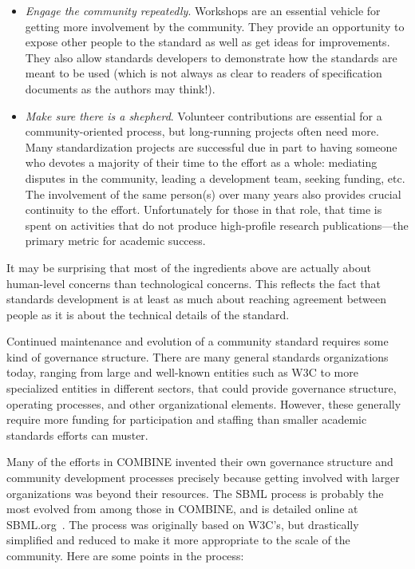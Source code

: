 \begin{itemize}
\item \emph{Engage the community repeatedly}.  Workshops are an essential vehicle for getting more involvement by the community.  They provide an opportunity to expose other people to the standard as well as get ideas for improvements.  They also allow standards developers to demonstrate how the standards are meant to be used (which is not always as clear to readers of specification documents as the authors may think!).

\item \emph{Make sure there is a shepherd}. Volunteer contributions are essential for a community-oriented process, but long-running projects often need more.  Many standardization projects are successful due in part to having someone who devotes a majority of their time to the effort as a whole: mediating disputes in the community, leading a development team, seeking funding, etc.  The involvement of the same person(s) over many years also provides crucial continuity to the effort.  Unfortunately for those in that role, that time is spent on activities that do not produce high-profile research publications---the primary metric for academic success.

\end{itemize}
\vspace*{-1em}

It may be surprising that most of the ingredients above are actually about human-level concerns than technological concerns.  This reflects the fact that standards development is at least as much about reaching agreement between people as it is about the technical details of the standard.


\clearpage
{}

Continued maintenance and evolution of a community standard requires some kind of governance structure.  There are many general standards organizations today, ranging from large and well-known entities such as W3C to more specialized entities in different sectors, that could provide governance structure, operating processes, and other organizational elements.  However, these generally require more funding for participation and staffing than smaller academic standards efforts can muster.

Many of the efforts in COMBINE invented their own governance structure and community development processes precisely because getting involved with larger organizations was beyond their resources.  The SBML process is probably the most evolved from among those in COMBINE, and is detailed online at SBML.org~\cite{sbml-process}.  The process was originally based on W3C's, but drastically simplified and reduced to make it more appropriate to the scale of the community.  Here are some points in the process:

